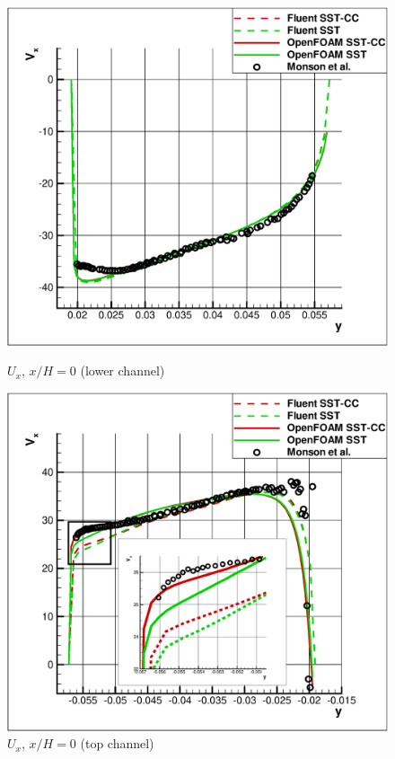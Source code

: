 \documentclass[a4paper]{jpconf}
\begin{document}
\begin{figure}[ht]
	\begin{minipage}{0.45\linewidth}
		\includegraphics[scale=0.33]{xh0up}
		\caption{$U_x$, $x/H=0$ (lower channel)}
		\label{fig:x0up}
	\end{minipage}
	\hspace{0.5em}
	\begin{minipage}{0.45\linewidth}
		\includegraphics[scale=0.33]{xh0down}
		\caption{$U_x$, $x/H=0$ (top channel)}
		\label{fig:x0down}
	\end{minipage}
\end{figure}
\end{document}
